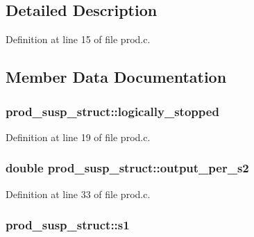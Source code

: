 \subsection{Detailed Description}


Definition at line 15 of file prod.\+c.



\subsection{Member Data Documentation}
\subsubsection[{\texorpdfstring{logically\+\_\+stopped}{logically_stopped}}]{ prod\+\_\+susp\+\_\+struct\+::logically\+\_\+stopped}\hypertarget{structprod__susp__struct_a54c52685c2f6852c4dd963b1a5d5f81e}{}\label{structprod__susp__struct_a54c52685c2f6852c4dd963b1a5d5f81e}


Definition at line 19 of file prod.\+c.

\subsubsection[{\texorpdfstring{output\+\_\+per\+\_\+s2}{output_per_s2}}]{\setlength{\rightskip}{0pt plus 5cm}double prod\+\_\+susp\+\_\+struct\+::output\+\_\+per\+\_\+s2}\hypertarget{structprod__susp__struct_a0a31dd9b54024c13682b75b12455a1f6}{}\label{structprod__susp__struct_a0a31dd9b54024c13682b75b12455a1f6}


Definition at line 33 of file prod.\+c.

\subsubsection[{\texorpdfstring{s1}{s1}}]{ prod\+\_\+susp\+\_\+struct\+::s1}\hypertarget{structprod__susp__struct_a186ffdbfce891fca1fc1a48c44801c03}{}\label{structprod__susp__struct_a186ffdbfce891fca1fc1a48c44801c03}


